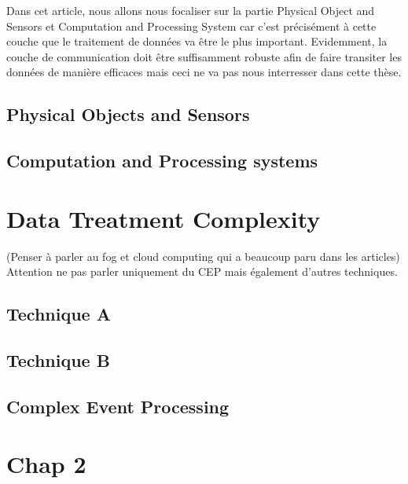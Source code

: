 \documentclass[11pt]{article}
\begin{document}
Dans cet article, nous allons nous focaliser sur la partie Physical Object and Sensors et Computation and Processing System car c'est précisément à cette couche que le traitement de données va être le plus important. Evidemment, la couche de communication doit être suffisamment robuste afin de faire transiter les données de manière efficaces mais ceci ne va pas nous interresser dans cette thèse.

\subsection{Physical Objects and Sensors}



\subsection{Computation and Processing systems}



\section{Data Treatment Complexity}

(Penser à parler au fog et cloud computing qui a beaucoup paru dans les articles)
Attention ne pas parler uniquement du CEP mais également d'autres techniques.

\subsection{Technique A}

\subsection{Technique B}

\subsection{Complex Event Processing}



\section{Chap 2}
\end{document}
